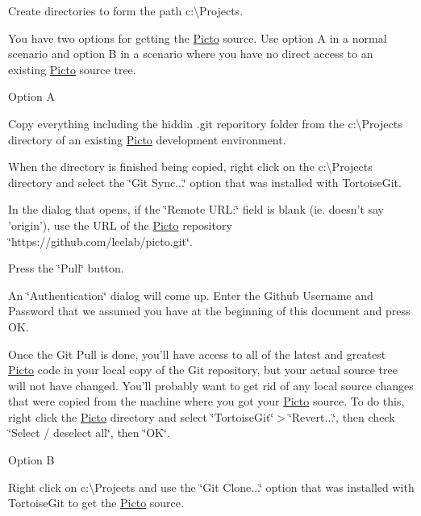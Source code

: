 \begin{DoxyEnumerate}
\item Create directories to form the path c\-:\textbackslash{}Projects.
\item You have two options for getting the \hyperlink{namespace_picto}{Picto} source. Use option A in a normal scenario and option B in a scenario where you have no direct access to an existing \hyperlink{namespace_picto}{Picto} source tree.
\begin{DoxyEnumerate}
\item Option A
\begin{DoxyEnumerate}
\item Copy everything including the hiddin .git reporitory folder from the c\-:\textbackslash{}Projects directory of an existing \hyperlink{namespace_picto}{Picto} development environment.
\item When the directory is finished being copied, right click on the c\-:\textbackslash{}Projects directory and select the \char`\"{}\-Git Sync...\char`\"{} option that was installed with Tortoise\-Git.
\item In the dialog that opens, if the \char`\"{}\-Remote U\-R\-L\-:\char`\"{} field is blank (ie. doesn't say 'origin'), use the U\-R\-L of the \hyperlink{namespace_picto}{Picto} repository \char`\"{}https\-://github.\-com/leelab/picto.\-git\char`\"{}.
\item Press the \char`\"{}\-Pull\char`\"{} button.
\item An \char`\"{}\-Authentication\char`\"{} dialog will come up. Enter the Github Username and Password that we assumed you have at the beginning of this document and press O\-K.
\item Once the Git Pull is done, you'll have access to all of the latest and greatest \hyperlink{namespace_picto}{Picto} code in your local copy of the Git repository, but your actual source tree will not have changed. You'll probably want to get rid of any local source changes that were copied from the machine where you got your \hyperlink{namespace_picto}{Picto} source. To do this, right click the \hyperlink{namespace_picto}{Picto} directory and select \char`\"{}\-Tortoise\-Git\char`\"{}$>$\char`\"{}\-Revert...\char`\"{}, then check \char`\"{}\-Select / deselect all\char`\"{}, then \char`\"{}\-O\-K\char`\"{}.
\end{DoxyEnumerate}
\item Option B
\begin{DoxyEnumerate}
\item Right click on c\-:\textbackslash{}Projects and use the \char`\"{}\-Git Clone...\char`\"{} option that was installed with Tortoise\-Git to get the \hyperlink{namespace_picto}{Picto} source.

\end{DoxyEnumerate}
\end{DoxyEnumerate}
\end{DoxyEnumerate}
